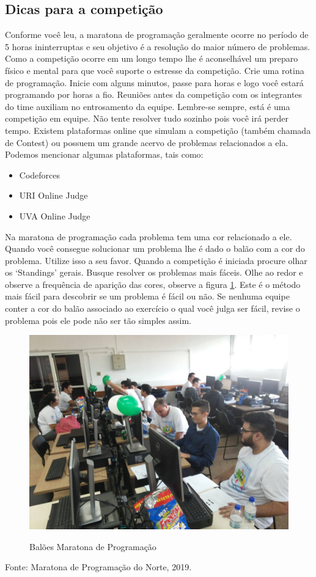 \subsection{Dicas para a competição}
Conforme você leu, a maratona de programação geralmente ocorre no período de 5 horas ininterruptas e seu objetivo é a resolução do maior número de problemas. Como a competição ocorre em um longo tempo lhe é aconselhável um preparo físico e mental para que você suporte o estresse da competição. Crie uma rotina de programação. Inicie com alguns minutos, passe para horas e logo você estará programando por horas a fio. Reuniões antes da competição com os integrantes do time auxiliam no entrosamento da equipe. Lembre-se sempre, está é uma competição em equipe. Não tente resolver tudo sozinho pois você irá perder tempo. Existem plataformas online que simulam a competição (também chamada de Contest) ou possuem um grande acervo de problemas relacionados a ela. Podemos mencionar algumas plataformas, tais como:
\begin{itemize}
    \item Codeforces
    \item URI Online Judge
    \item UVA Online Judge
\end{itemize}

Na maratona de programação cada problema tem uma cor relacionado a ele. Quando você consegue solucionar um problema lhe é dado o balão com a cor do problema. Utilize isso a seu favor. Quando a competição é iniciada procure olhar os `Standings' gerais. Busque resolver os problemas mais fáceis. Olhe ao redor e observe a frequência de aparição das cores, observe a figura \ref{fig:balao}. Este é o método mais fácil para descobrir se um problema é fácil ou não. Se nenhuma equipe conter a cor do balão associado ao exercício o qual você julga ser fácil, revise o problema pois ele pode não ser tão simples assim.

\begin{figure}[H]
    \caption{Balões Maratona de Programação}    
    \centering
    \includegraphics[scale = 0.2]{image/balao.jpg}
    \label{fig:balao}
\end{figure}
\begin{center}
    Fonte: Maratona de Programação do Norte, 2019.
\end{center}


